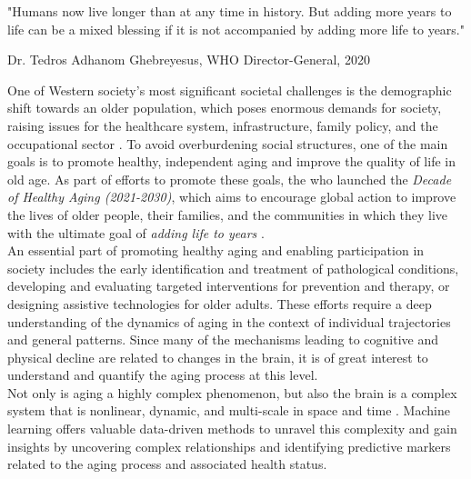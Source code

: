 \setlength{\epigraphwidth}{0.6\textwidth}
\epigraph{\centering "Humans now live longer than at any time in history. But adding more years to life can be a mixed blessing if it is not accompanied by adding more life to years."} {Dr. Tedros Adhanom Ghebreyesus, WHO Director-General, 2020}

\noindent One of Western society's most significant societal challenges is the demographic shift towards an older population, which poses enormous demands for society, raising issues for the healthcare system, infrastructure, family policy, and the occupational sector \cite{who_aging2023}. To avoid overburdening social structures, one of the main goals is to promote healthy, independent aging and improve the quality of life in old age. As part of efforts to promote these goals, the \gls{who} launched the \textit{Decade of Healthy Aging (2021-2030)}, which aims to encourage global action to improve the lives of older people, their families, and the communities in which they live with the ultimate goal of \textit{adding life to years} \cite{who_aging2023}.\\
An essential part of promoting healthy aging and enabling participation in society includes  the early identification and treatment of pathological conditions, developing and evaluating targeted interventions for prevention and therapy, or designing assistive technologies for older adults. These efforts require a deep understanding of the dynamics of aging in the context of individual trajectories and general patterns. Since many of the mechanisms leading to cognitive and physical decline are related to changes in the brain, it is of great interest to understand and quantify the aging process at this level.\\
Not only is aging a highly complex phenomenon, but also the brain is a complex system that is nonlinear, dynamic, and multi-scale in space and time \cite{Betzel2017}. Machine learning offers valuable data-driven methods to unravel this complexity and gain insights by uncovering complex relationships and identifying predictive markers related to the aging process and associated health status.\\
